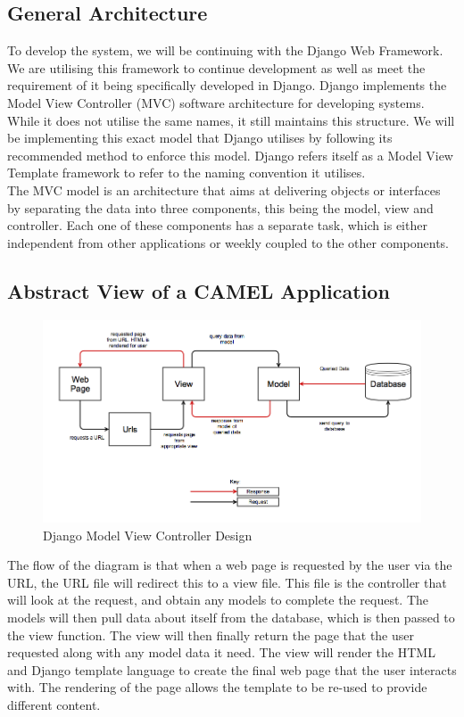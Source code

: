 \subsection{General Architecture}
	To develop the system, we will be continuing with the Django Web Framework. We are utilising this framework to continue development as well as meet the requirement of it being specifically developed in Django. Django implements the Model View Controller (MVC) software architecture for developing systems. While it does not utilise the same names, it still maintains this structure. We will be implementing this exact model that Django utilises by following its recommended method to enforce this model. Django refers itself as a Model View Template framework to refer to the naming convention it utilises.\\
		
		\noindent The MVC model is an architecture that aims at delivering objects or interfaces by separating the data into three components, this being the model, view and controller. Each one of these components has a separate task, which is either independent from other applications or weekly coupled to the other components.\\
		
		\subsection{Abstract View of  a CAMEL Application}	
		\begin{figure}[h]
			\includegraphics[scale=0.40]{softwarearchitecture/img/caml_mvc_abstract_diagram}
			\caption{Django Model View Controller Design}
		\end{figure}
		
		The flow of the diagram is that when a web page is requested by the user via the URL, the URL file will redirect this to a view file. This file is the controller that will look at the request, and obtain any models to complete the request. The models will then pull data about itself from the database, which is then passed to the view function. The view will then finally return the page that the user requested along with any model data it need. The view will render the HTML and Django template language to create the final web page that the user interacts with. The rendering of the page allows the template to be re-used to provide different content.\\ 		
		
